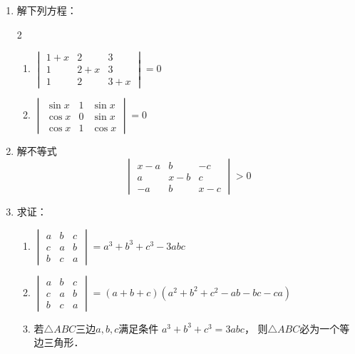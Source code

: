 \begin{enumerate}
\item 解下列方程：
\begin{multicols}{2}
\begin{enumerate}
    \item $\begin{vmatrix}
        1+x&2&3\\1&2+x&3\\1&2&3+x
    \end{vmatrix}=0$
    \item $\begin{vmatrix}
        \sin x&1&\sin x\\ \cos x&0&\sin x\\ \cos x&1&\cos x
    \end{vmatrix}=0$
\end{enumerate}
\end{multicols}

\item 解不等式
\[\begin{vmatrix}
    x-a&b&-c\\a&x-b&c\\-a&b&x-c
\end{vmatrix}>0\]

\item 求证：
\begin{enumerate}
    \item $\begin{vmatrix}
        a&b&c\\c&a&b\\b&c&a
    \end{vmatrix}=a^3+b^3+c^3-3abc$
    \item $\begin{vmatrix}
        a&b&c\\c&a&b\\b&c&a
    \end{vmatrix}=(a+b+c)(a^2+b^2+c^2-ab-bc-ca)$
    \item 若$\triangle ABC$三边$a,b,c$满足条件
    $a^3+b^3+c^3=3abc$，
    则$\triangle ABC$必为一个等边三角形．
\end{enumerate}


\end{enumerate}
